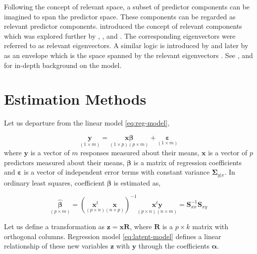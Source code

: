 \documentclass[12pt,3p,authoryear]{elsarticle}
\begin{document}
Following the concept of relevant space, a subset of predictor components can be imagined to span the predictor space. These components can be regarded as relevant predictor components. \citet{Naes1985} introduced the concept of relevant components which was explored further by \citet{helland1990partial}, \citet{naes1993relevant}, \citet{Helland1994b} and \citet{Helland2000}. The corresponding eigenvectors were referred to as relevant eigenvectors. A similar logic is introduced by \citet{cook2010envelope} and later by \citet{cook2013envelopes} as an envelope which is the space spanned by the relevant eigenvectors \citep[, p.101]{cook2018envelope}. See \citet{Rimal2018}, \citet{saebo2015simrel} and \citet{rimal2019pred} for in-depth background on the model.

\hypertarget{estimation-methods}{%
\section{Estimation Methods}\label{estimation-methods}}

Let us departure from the linear model \eqref{eq:reg-model},

\begin{equation}
\underset{(1\times m)}{\mathbf{y}} =
  \underset{(1\times p)(p\times m)}
    {\mathbf{x}\boldsymbol{\beta}} +
  \underset{(1 \times m)}{\boldsymbol{\varepsilon}}
\label{eq:reg-model}
\end{equation}
where \(\mathbf{y}\) is a vector of \(m\) responses measured about their means, \(\mathbf{x}\) is a vector of \(p\) predictors measured about their means, \(\boldsymbol{\beta}\) is a matrix of regression coefficients and \(\boldsymbol{\varepsilon}\) is a vector of independent error terms with constant variance \(\boldsymbol{\Sigma}_{y|x}\). In ordinary least squares, coefficient \(\boldsymbol{\beta}\) is estimated as,

\begin{equation}
\underset{(p\times m)}{\boldsymbol{\hat{\beta}}} =
  \left(\underset{(p\times n)}{\mathbf{x}^t}
  \underset{(n\times p)}{\mathbf{x}}\right)^{-1}
  \underset{(p \times n)(n \times m)}{\mathbf{x}^t\mathbf{y}} =
  \mathbf{S}_{xx}^{-1}\mathbf{S}_{xy}
\label{eq:ols-coef}
\end{equation}

Let us define a transformation as \(\mathbf{z} = \mathbf{xR}\), where \(\mathbf{R}\) is a \(p\times k\) matrix with orthogonal columns. Regression model \eqref{eq:latent-model} defines a linear relationship of these new variables \(\mathbf{z}\) with \(\mathbf{y}\) through the coefficients \(\boldsymbol{\alpha}\).
\end{document}
